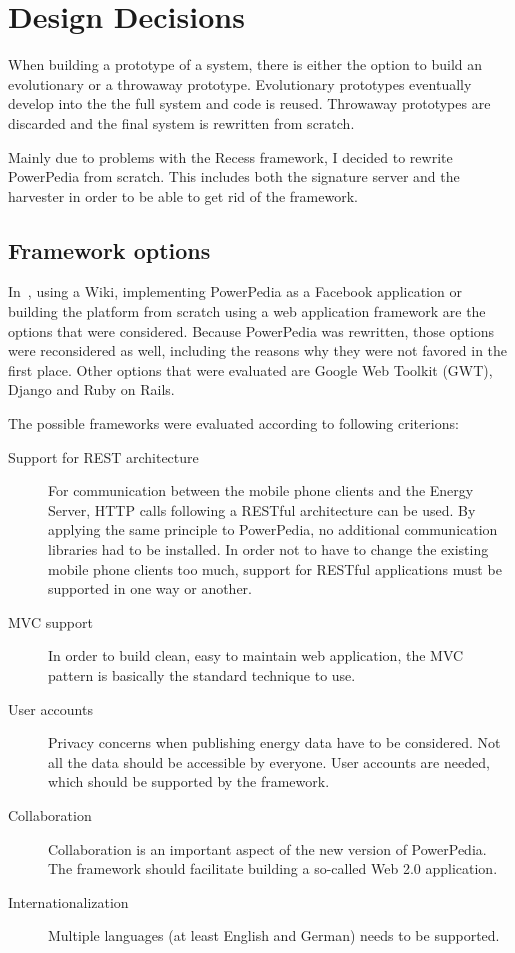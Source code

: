 \section{Design Decisions}
When building a prototype of a system, there is either the option to build an evolutionary or a throwaway prototype. Evolutionary prototypes eventually develop into the the full system \cite{interactive_systems} and code is reused. Throwaway prototypes are discarded and the final system is rewritten from scratch. 

Mainly due to problems with the Recess framework, I decided to rewrite PowerPedia from scratch. This includes both the signature server and the harvester in order to be able to get rid of the framework. 

\subsection{Framework options}
In~\cite{merklepp}, using a Wiki, implementing PowerPedia as a Facebook application or building the platform from scratch using a web application framework are the options that were considered. 
Because PowerPedia was rewritten, those options were reconsidered as well, including the reasons why they were not favored in the first place. Other options that were evaluated are Google Web Toolkit (GWT), Django and Ruby on Rails.  

The possible frameworks were evaluated according to following criterions:
\begin{description}
 \item[Support for REST architecture] For communication between the mobile phone clients and the Energy Server, HTTP calls following a RESTful architecture can be used. By applying the same principle to PowerPedia, no additional communication libraries had to be installed. In order not to have to change the existing mobile phone clients too much, support for RESTful applications must be supported in one way or another.
 \item[MVC support] In order to build clean, easy to maintain web application, the MVC pattern is basically the standard technique to use. 
 \item[User accounts] Privacy concerns when publishing energy data have to be considered. Not all the data should be accessible by everyone. User accounts are needed, which should be supported by the framework.
 \item[Collaboration] Collaboration is an important aspect of the new version of PowerPedia. The framework should facilitate building a so-called Web 2.0 application.
 \item[Internationalization] Multiple languages (at least English and German) needs to be supported.
\end{description}

